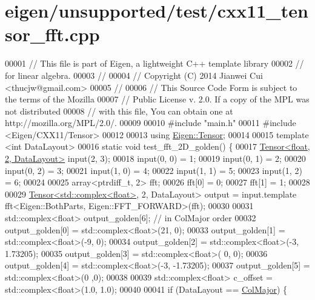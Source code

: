 \hypertarget{eigen_2unsupported_2test_2cxx11__tensor__fft_8cpp_source}{}\section{eigen/unsupported/test/cxx11\+\_\+tensor\+\_\+fft.cpp}
\label{eigen_2unsupported_2test_2cxx11__tensor__fft_8cpp_source}

\begin{DoxyCode}
00001 \textcolor{comment}{// This file is part of Eigen, a lightweight C++ template library}
00002 \textcolor{comment}{// for linear algebra.}
00003 \textcolor{comment}{//}
00004 \textcolor{comment}{// Copyright (C) 2014 Jianwei Cui <thucjw@gmail.com>}
00005 \textcolor{comment}{//}
00006 \textcolor{comment}{// This Source Code Form is subject to the terms of the Mozilla}
00007 \textcolor{comment}{// Public License v. 2.0. If a copy of the MPL was not distributed}
00008 \textcolor{comment}{// with this file, You can obtain one at http://mozilla.org/MPL/2.0/.}
00009 
00010 \textcolor{preprocessor}{#include "main.h"}
00011 \textcolor{preprocessor}{#include <Eigen/CXX11/Tensor>}
00012 
00013 \textcolor{keyword}{using} \hyperlink{class_eigen_1_1_tensor}{Eigen::Tensor};
00014 
00015 \textcolor{keyword}{template} <\textcolor{keywordtype}{int} DataLayout>
00016 \textcolor{keyword}{static} \textcolor{keywordtype}{void} test\_fft\_2D\_golden() \{
00017   \hyperlink{class_eigen_1_1_tensor}{Tensor<float, 2, DataLayout>} input(2, 3);
00018   input(0, 0) = 1;
00019   input(0, 1) = 2;
00020   input(0, 2) = 3;
00021   input(1, 0) = 4;
00022   input(1, 1) = 5;
00023   input(1, 2) = 6;
00024 
00025   array<ptrdiff\_t, 2> fft;
00026   fft[0] = 0;
00027   fft[1] = 1;
00028 
00029   \hyperlink{class_eigen_1_1_tensor}{Tensor<std::complex<float>}, 2, DataLayout> output = input.template 
      fft<Eigen::BothParts, Eigen::FFT\_FORWARD>(fft);
00030 
00031   std::complex<float> output\_golden[6]; \textcolor{comment}{// in ColMajor order}
00032   output\_golden[0] = std::complex<float>(21, 0);
00033   output\_golden[1] = std::complex<float>(-9, 0);
00034   output\_golden[2] = std::complex<float>(-3, 1.73205);
00035   output\_golden[3] = std::complex<float>( 0, 0);
00036   output\_golden[4] = std::complex<float>(-3, -1.73205);
00037   output\_golden[5] = std::complex<float>(0 ,0);
00038 
00039   std::complex<float> c\_offset = std::complex<float>(1.0, 1.0);
00040 
00041   \textcolor{keywordflow}{if} (DataLayout == \hyperlink{group__enums_ggaacded1a18ae58b0f554751f6cdf9eb13a0cbd4bdd0abcfc0224c5fcb5e4f6669a}{ColMajor}) \{

\end{DoxyCode}
